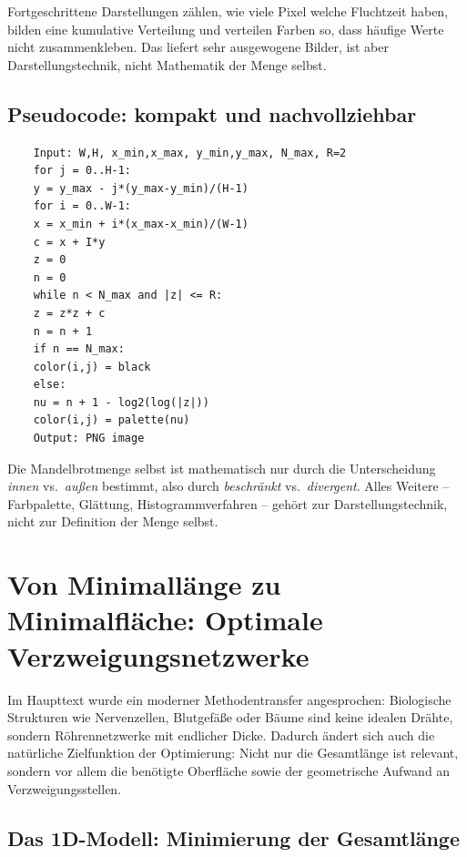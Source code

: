 Fortgeschrittene Darstellungen zählen, wie viele Pixel welche Fluchtzeit haben, bilden eine kumulative Verteilung und verteilen Farben so,
dass häufige Werte nicht \glqq zusammenkleben\grqq. Das liefert sehr ausgewogene Bilder, ist aber Darstellungstechnik, nicht Mathematik der Menge selbst.

\subsection{Pseudocode: kompakt und nachvollziehbar}

\begin{verbatim}
	Input: W,H, x_min,x_max, y_min,y_max, N_max, R=2
	for j = 0..H-1:
	y = y_max - j*(y_max-y_min)/(H-1)
	for i = 0..W-1:
	x = x_min + i*(x_max-x_min)/(W-1)
	c = x + I*y
	z = 0
	n = 0
	while n < N_max and |z| <= R:
	z = z*z + c
	n = n + 1
	if n == N_max:
	color(i,j) = black
	else:
	nu = n + 1 - log2(log(|z|))
	color(i,j) = palette(nu)
	Output: PNG image
\end{verbatim}

\begin{NoteBox}
	\label{box:mandelbrot-leserhinweis}
	Die Mandelbrotmenge selbst ist mathematisch nur durch die Unterscheidung
	\emph{innen} vs.\ \emph{außen} bestimmt, also durch
	\emph{beschränkt} vs.\ \emph{divergent}.
	Alles Weitere -- Farbpalette, Glättung, Histogrammverfahren --
	gehört zur Darstellungstechnik, nicht zur Definition der Menge selbst.
\end{NoteBox}

\section{Von Minimallänge zu Minimalfläche: Optimale Verzweigungsnetzwerke}
\label{app:netzwerke-minimalflaeche}

Im Haupttext wurde ein moderner Methodentransfer angesprochen:
Biologische Strukturen wie Nervenzellen, Blutgefäße oder Bäume sind keine idealen \glqq Drähte\grqq{},
sondern Röhrennetzwerke mit endlicher Dicke.
Dadurch ändert sich auch die natürliche Zielfunktion der Optimierung:
Nicht nur die Gesamtlänge ist relevant, sondern vor allem die benötigte Oberfläche
sowie der geometrische Aufwand an Verzweigungsstellen.

\subsection{Das 1D-Modell: Minimierung der Gesamtlänge}

